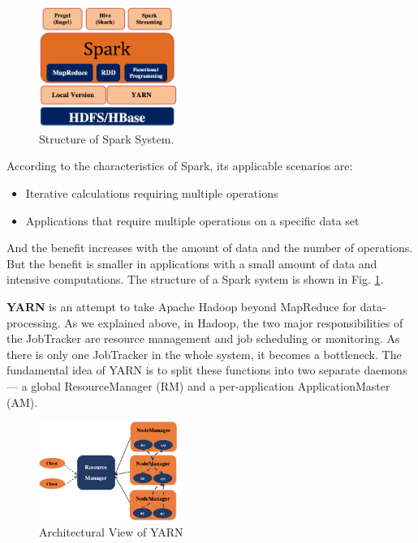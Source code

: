 \documentclass[	DIV=calc,%
							paper=a4,%
							fontsize=11pt,%
							twocolumn]{scrartcl}	 					%
\begin{document}
\begin{figure}
  \centering
    \includegraphics[width=0.4\textwidth]{images/spark.png}
    \caption{Structure of Spark System.}
    \label{fig:Spark}   
\end{figure}

According to the characteristics of Spark, its applicable scenarios are:

\begin{itemize}
\item Iterative calculations requiring multiple operations

\item Applications that require multiple operations on a specific data set

\end{itemize}

And the benefit increases with the amount of data and the number of operations. But the benefit is smaller in applications with a small amount of data and intensive computations.
The structure of a Spark system is shown in Fig. \ref{fig:Spark}.

\textbf{YARN} \cite{3} is an attempt to take Apache Hadoop beyond MapReduce for data-processing. As we explained above, in Hadoop, the two major responsibilities of the JobTracker are resource management and job scheduling or monitoring. As there is only one JobTracker in the whole system, it becomes a bottleneck. The fundamental idea of YARN is to split these functions into two separate daemons --- a global ResourceManager (RM) and a per-application ApplicationMaster (AM).

\begin{figure}
  \centering
    \includegraphics[width=0.4\textwidth]{images/YARN.png}
    \caption{Architectural View of YARN}
    \label{fig:YARN}   
\end{figure}
\end{document}

